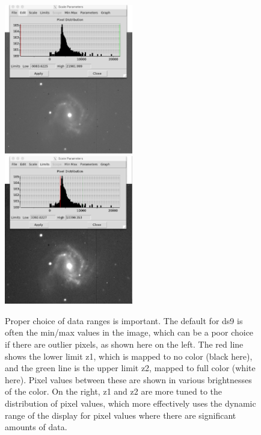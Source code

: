\begin{figure}
	\includegraphics[width=0.5\textwidth]{inventing-color/z-min-max}
	\includegraphics[width=0.5\textwidth]{inventing-color/z-mid}
	\caption{Proper choice of data ranges is important. The default for ds9 is often the min/max values in the image, which can be a poor choice if there are outlier pixels, as shown here on the left. The red line shows the lower limit z1, which is mapped to no color (black here), and the green line is the upper limit z2, mapped to full color (white here). Pixel values between these are shown in various brightnesses of the color. On the right, z1 and z2 are more tuned to the distribution of pixel values, which more effectively uses the dynamic range of the display for pixel values where there are significant amounts of data.}\label{ic:fig:z-min-max}
\end{figure}

